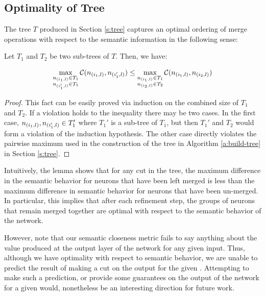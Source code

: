 

\subsection{Optimality of Tree}
\label{s:optimal-tree}

The tree $T$ produced in Section \ref{s:tree} captures an optimal ordering of
merge operations with respect to the semantic information in the following
sense:

\begin{lemma}
Let $T_1$ and $T_2$ be two sub-trees of $T$. Then, we have:

\begin{equation*}
\begin{aligned}
    \max_{ \substack{ n_{(i_1,l)} \in T_1 \\ n_{(i_1',l)} \in T_1 }} 
    \mathcal{C}( n_{(i_1,l)}, n_{(i_1',l)} ) \leq
    \max_{ \substack{ n_{(i_1,l)} \in T_1 \\ n_{(i_2,l)} \in T_2 }} 
    \mathcal{C}( n_{(i_1,l)}, n_{(i_2,l)} )
\end{aligned}
\end{equation*}

\end{lemma}
\begin{proof}
This fact can be easily proved via induction on the combined size of $T_1$ and
$T_2$. If a violation holds to the inequality there may be two cases. In the
first case, $n_{(i_1,l)}, n_{(i_1',l)} \in T_1'$ where $T_1'$ is a sub-tree of
$T_1$, but then $T_1'$ and $T_2$ would form a violation of the induction
hypothesis. The other case directly violates the pairwise maximum used in the
construction of the tree in Algorithm \ref{a:build-tree} in Section \ref{s:tree}.
\end{proof}

Intuitively, the lemma shows that for any cut in the tree, the
maximum difference in the semantic behavior for neurons that have been left
merged is less than the maximum difference in semantic behavior for neurons that
have been un-merged. In particular, this implies that after each refinement
step, the groups of neurons that remain merged together are optimal with respect
to the semantic behavior of the network.

However, note that our semantic closeness metric fails to say anything about the
value produced at the output layer of the network for any given input. Thus,
although we have optimality with respect to semantic behavior, we are unable to
predict the result of making a cut on the output for the given \gencex.
Attempting to make such a prediction, or provide some guarantees on the output
of the network for a given \gencex would, nonetheless be an interesting
direction for future work.

